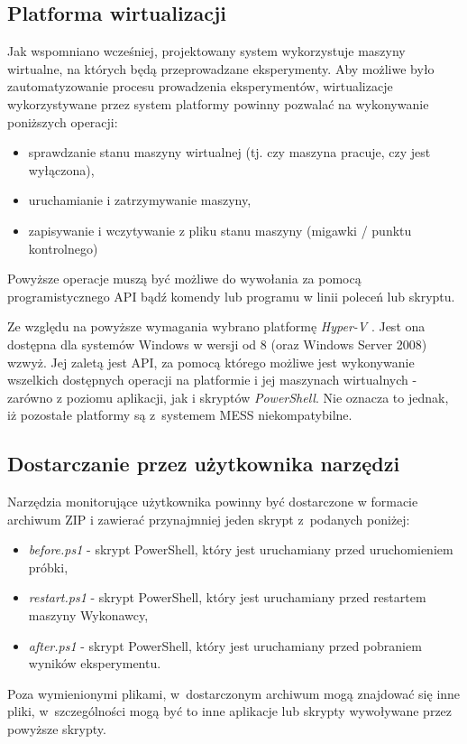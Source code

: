 \documentclass[a4paper,12pt,oneside]{article}
\begin{document}
	\subsection{Platforma wirtualizacji}
	Jak wspomniano wcześniej, projektowany system wykorzystuje maszyny wirtualne, na których będą przeprowadzane eksperymenty. Aby możliwe było zautomatyzowanie procesu prowadzenia eksperymentów, wirtualizacje wykorzystywane przez system platformy powinny pozwalać na wykonywanie poniższych operacji:
	\begin{itemize}
		\item sprawdzanie stanu maszyny wirtualnej (tj. czy maszyna pracuje, czy jest wyłączona),
		\item uruchamianie i zatrzymywanie maszyny,
		\item zapisywanie i wczytywanie z pliku stanu maszyny (migawki / punktu kontrolnego)
	\end{itemize}
	
	Powyższe operacje muszą być możliwe do wywołania za pomocą programistycznego API bądź komendy lub programu w linii poleceń lub skryptu.
				
	Ze względu na powyższe wymagania wybrano platformę \textit{Hyper-V} \cite{www-hyperv}. Jest ona dostępna dla systemów Windows w wersji od 8 (oraz Windows Server 2008) wzwyż. Jej zaletą jest API, za pomocą którego możliwe jest wykonywanie wszelkich dostępnych operacji na platformie i jej maszynach wirtualnych - zarówno z poziomu aplikacji, jak i skryptów \textit{PowerShell}. Nie oznacza to jednak, iż pozostałe platformy są z~systemem MESS niekompatybilne.
				
	\subsection{Dostarczanie przez użytkownika narzędzi}
	
	Narzędzia monitorujące użytkownika powinny być dostarczone w formacie archiwum ZIP i zawierać przynajmniej jeden skrypt z~podanych poniżej:
	\begin{itemize}
		\item \textit{before.ps1} - skrypt PowerShell, który jest uruchamiany przed uruchomieniem próbki,
		\item \textit{restart.ps1} - skrypt PowerShell, który jest uruchamiany przed restartem maszyny Wykonawcy,
		\item \textit{after.ps1} - skrypt PowerShell, który jest uruchamiany przed pobraniem wyników eksperymentu.
	\end{itemize}
	Poza wymienionymi plikami, w~dostarczonym archiwum mogą znajdować się inne pliki, w~szczególności mogą być to inne aplikacje lub skrypty wywoływane przez powyższe skrypty.
	
\end{document}

